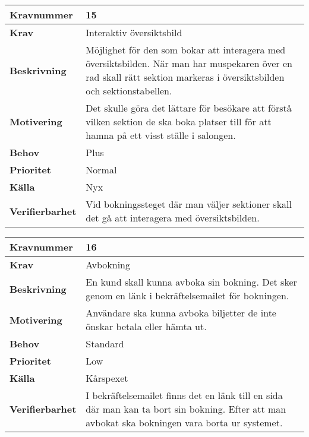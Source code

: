 \documentclass[a4paper, twoside, 11pt, titlepage]{article}
\begin{document}
\begin{tabular} { | p{3cm} | p{12.2cm} | }
	\hline
	\textbf{Kravnummer} & 15  \\
	\hline
	\textbf{Krav} & Interaktiv översiktsbild  \\
	\hline
	\textbf{Beskrivning} & Möjlighet för den som bokar att interagera med översiktsbilden. När man har muspekaren över en rad skall rätt sektion markeras i översiktsbilden och sektionstabellen.  \\
	\hline
	\textbf{Motivering} & Det skulle göra det lättare för besökare att förstå vilken sektion de ska boka platser till för att hamna på ett visst ställe i salongen.  \\
	\hline
	\textbf{Behov} & Plus  \\
	\hline
	\textbf{Prioritet} & Normal  \\
	\hline
	\textbf{Källa} & Nyx  \\
	\hline
	\textbf{Verifierbarhet} & Vid bokningssteget där man väljer sektioner skall det gå att interagera med översiktsbilden.   \\
	\hline
\end{tabular}

\begin{tabular} { | p{3cm} | p{12.2cm} | }
	\hline
	\textbf{Kravnummer} & 16  \\
	\hline
	\textbf{Krav} & Avbokning  \\
	\hline
	\textbf{Beskrivning} & En kund skall kunna avboka sin bokning. Det sker genom en länk i bekräftelsemailet för bokningen.  \\
	\hline
	\textbf{Motivering} & Användare ska kunna avboka biljetter de inte önskar betala eller hämta ut.  \\
	\hline
	\textbf{Behov} & Standard  \\
	\hline
	\textbf{Prioritet} & Low  \\
	\hline
	\textbf{Källa} & Kårspexet  \\
	\hline
	\textbf{Verifierbarhet} & I bekräftelsemailet finns det en länk till en sida där man kan ta bort sin bokning. Efter att man avbokat ska bokningen vara borta ur systemet.  \\
	\hline
\end{tabular}
\end{document}
